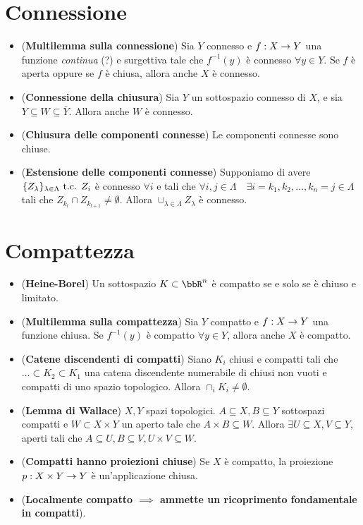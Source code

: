 \documentclass[a4paper,NoNotes,GeneralMath]{stdmdoc}
\begin{document}
	\section*{Connessione}
	\begin{itemize}
		\item ({\bf Multilemma sulla connessione}) Sia $Y$ connesso e $f: X \rightarrow Y$ una funzione {\it continua} (?) e surgettiva tale che $f^{-1}(y)$ è connesso $\forall y \in Y$. Se $f$ è aperta oppure se $f$ è chiusa, allora anche $X$ è connesso.
		\item ({\bf Connessione della chiusura}) Sia $Y$ un sottospazio connesso di $X$, e sia $Y \subseteq W \subseteq \bar{Y}$. Allora anche $W$ è connesso.
		\item ({\bf Chiusura delle componenti connesse}) Le componenti connesse sono chiuse.
		\item ({\bf Estensione delle componenti connesse}) Supponiamo di avere $\{Z_\lambda\}_{\lambda \in \Lambda} \mbox{ t.c. } Z_i$ è connesso $\forall i$ e tali che $\forall i, j \in \Lambda \quad \exists i=k_1, k_2, \ldots, k_n = j \in \Lambda$ tali che $Z_{k_l} \cap Z_{k_{l+1}} \neq \emptyset$. Allora $\cup_{\lambda \in \Lambda} Z_\lambda$ è connesso.
	\end{itemize}

	\section*{Compattezza}
	\begin{itemize}
		\item ({\bf Heine-Borel}) Un sottospazio $K \subset \bbR^n$ è compatto se e solo se è chiuso e limitato.
		\item ({\bf Multilemma sulla compattezza}) Sia $Y$ compatto e $f: X \rightarrow Y$ una funzione chiusa. Se $f^{-1}(y)$ è compatto $\forall y \in Y$, allora anche $X$ è compatto.
		\item ({\bf Catene discendenti di compatti}) Siano $K_i$ chiusi e compatti tali che $\ldots \subset K_2 \subset K_1$ una catena discendente numerabile di chiusi non vuoti e compatti di uno spazio topologico. Allora $\cap_i K_i \neq \emptyset$.
		\item ({\bf Lemma di Wallace}) $X,Y$ spazi topologici. $A \subseteq X, B \subseteq Y$ sottospazi compatti e $W \subset X \times Y$ un aperto tale che $A \times B \subseteq W$. Allora $\exists U \subseteq X, V \subseteq Y$, aperti tali che $A \subseteq U, B \subseteq V, U\times V \subseteq W$.
		\item ({\bf Compatti hanno proiezioni chiuse}) Se $X$ è compatto, la proiezione $p: X \times Y \rightarrow Y$ è un'applicazione chiusa.
		\item ({\bf Localmente compatto $\implies$ ammette un ricoprimento fondamentale in compatti}).
	\end{itemize}
\end{document}
